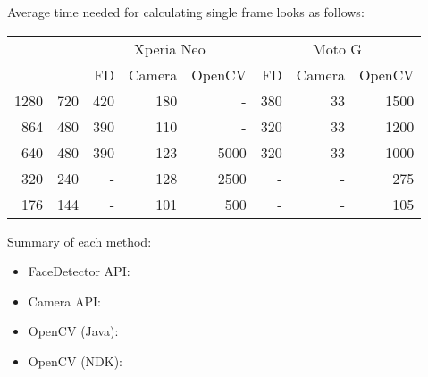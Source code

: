 Average time needed for calculating single frame looks as follows:
\begin{center}
\begin{tabular}{r@{ x }l|r|r|r|r|r|r}
\multicolumn{2}{c|}{} & \multicolumn{3}{c|}{Xperia Neo} &
\multicolumn{3}{c}{Moto G}
\\
\multicolumn{2}{c|}{} & \hspace{4ex}FD & Camera & OpenCV & \hspace{4ex}FD &
Camera & OpenCV
\\
\hline 1280 & 720 & 420 & 180 & - & 380 & 33 & 1500 \\
864 & 480 & 390 & 110 & - & 320 & 33 & 1200 \\
640 & 480 & 390 & 123 & 5000 & 320 & 33 & 1000 \\
320 & 240 & - & 128 & 2500 & - & - & 275 \\
176 & 144 & - & 101 & 500 & - & - & 105
\end{tabular}
\end{center}

Summary of each method:
\begin{itemize}
  \item FaceDetector API:
  \item Camera API:
  \item OpenCV (Java):
  \item OpenCV (NDK):
\end{itemize}
